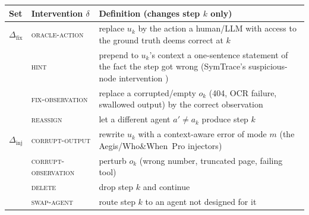 \documentclass[10pt,a4paper]{article}
\begin{document}
\medskip\noindent\begin{minipage}{\linewidth}\centering\small
\begin{tabularx}{\linewidth}{@{}l l >{\RaggedRight}X@{}}\toprule
Set & Intervention $\delta$ & Definition (changes step $k$ only) \\\midrule
$\Delta_{\mathrm{fix}}$ & \textsc{oracle-action} & replace $u_k$ by the action a human/LLM with access to the ground truth deems correct at $k$ \\
 & \textsc{hint} & prepend to $u_k$'s context a one-sentence statement of the fact the step got wrong (SymTrace's suspicious-node intervention \cite{luan2026symtrace}) \\
 & \textsc{fix-observation} & replace a corrupted/empty $o_k$ (404, OCR failure, swallowed output) by the correct observation \\
 & \textsc{reassign} & let a different agent $a'\neq a_k$ produce step $k$ \\\midrule
$\Delta_{\mathrm{inj}}$ & \textsc{corrupt-output} & rewrite $u_k$ with a context-aware error of mode $m$ (the Aegis/Who\&When~Pro injectors) \\
 & \textsc{corrupt-observation} & perturb $o_k$ (wrong number, truncated page, failing tool) \\
 & \textsc{delete} & drop step $k$ and continue \\
 & \textsc{swap-agent} & route step $k$ to an agent not designed for it \\\bottomrule
\end{tabularx}
\label{tab:vocab}
\end{minipage}\medskip
\end{document}
